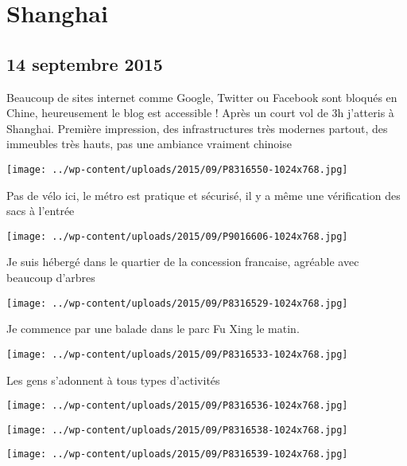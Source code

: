\chapter{Shanghai}
\section*{14 septembre 2015}
Beaucoup de sites internet comme Google, Twitter ou Facebook sont bloqués en Chine, heureusement le blog est accessible ! \newline
 Après un court vol de 3h j'atteris à Shanghai. Première impression, des infrastructures très modernes partout, des immeubles très hauts, pas une ambiance vraiment chinoise \newline
 \newline
\centerline{\texttt{[image: ../wp-content/uploads/2015/09/P8316550-1024x768.jpg]} } 
 \newline
 Pas de vélo ici, le métro est pratique et sécurisé, il y a même une vérification des sacs à l'entrée \newline
 \newline
\centerline{\texttt{[image: ../wp-content/uploads/2015/09/P9016606-1024x768.jpg]} } 
 \newline
 Je suis hébergé dans le quartier de la concession francaise, agréable avec beaucoup d'arbres \newline
 \newline
\centerline{\texttt{[image: ../wp-content/uploads/2015/09/P8316529-1024x768.jpg]} } 
 \newline
 Je commence par une balade dans le parc Fu Xing le matin. \newline
 \newline
\centerline{\texttt{[image: ../wp-content/uploads/2015/09/P8316533-1024x768.jpg]} } 
 \newline
 Les gens s'adonnent à tous types d'activités \newline
 \newline
\centerline{\texttt{[image: ../wp-content/uploads/2015/09/P8316536-1024x768.jpg]} } 
 \newline
 \newline
\centerline{\texttt{[image: ../wp-content/uploads/2015/09/P8316538-1024x768.jpg]} } 
 \newline
 \newline
\centerline{\texttt{[image: ../wp-content/uploads/2015/09/P8316539-1024x768.jpg]} } 
